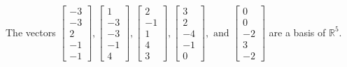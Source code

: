 \begin{exercise}
\begin{exerciseStatement}
  \end{exerciseStatement}
  \begin{exerciseAnswer}
   The vectors \(\left[\begin{array}{r}
-3 \\
-3 \\
2 \\
-1 \\
-1
\end{array}\right] , \left[\begin{array}{r}
1 \\
-3 \\
-3 \\
-1 \\
4
\end{array}\right] , \left[\begin{array}{r}
2 \\
-1 \\
1 \\
4 \\
3
\end{array}\right] , \left[\begin{array}{r}
3 \\
2 \\
-4 \\
-1 \\
0
\end{array}\right] , \text{ and } \left[\begin{array}{r}
0 \\
0 \\
-2 \\
3 \\
-2
\end{array}\right]\) 
  	 are  a basis of \(\mathbb{R}^5\).
  


  \end{exerciseAnswer}
\end{exercise}